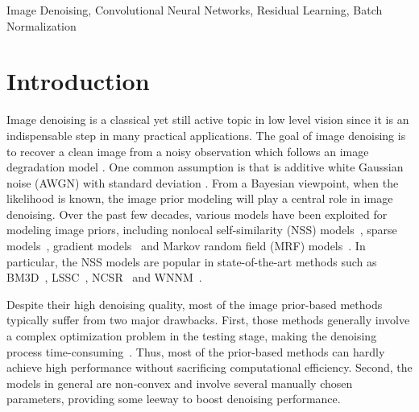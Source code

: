\documentclass[journal]{IEEEtran}
\begin{document}
\begin{IEEEkeywords}
Image Denoising, Convolutional Neural Networks, Residual Learning, Batch Normalization
\end{IEEEkeywords}



\IEEEpeerreviewmaketitle



\section{Introduction}



Image denoising is a classical yet still active topic in low level vision since it is an indispensable step in many practical applications. The goal of image denoising is to recover a clean image  from a noisy observation  which follows an image degradation model . One common assumption is that  is additive white Gaussian noise (AWGN) with standard deviation .
From a Bayesian viewpoint, when the likelihood is known, the image prior modeling will play a central role in image denoising. Over the past few decades, various models have been exploited for modeling image priors, including nonlocal self-similarity (NSS) models~\cite{buades2005non,dabov2007image,buades2008nonlocal,mairal2009non}, sparse models~\cite{mairal2009non,elad2006image,dong2013nonlocally}, gradient models~\cite{rudin1992nonlinear,osher2005iterative,weiss2007makes} and Markov random field (MRF) models~\cite{lan2006efficient,li2009markov,roth2009fields}. In particular, the NSS models are popular in state-of-the-art methods such as BM3D~\cite{dabov2007image}, LSSC~\cite{mairal2009non}, NCSR~\cite{dong2013nonlocally} and WNNM~\cite{gu2014weighted}.


Despite their high denoising quality, most of the image prior-based methods typically suffer from two major drawbacks. First, those methods generally involve a complex optimization problem in the testing stage, making the denoising process time-consuming~\cite{dong2013nonlocally,gu2014weighted}. Thus, most of the prior-based methods can hardly achieve high performance without sacrificing computational efficiency. Second, the models in general are non-convex and involve several manually chosen parameters, providing some leeway to boost denoising performance.
\end{document}
